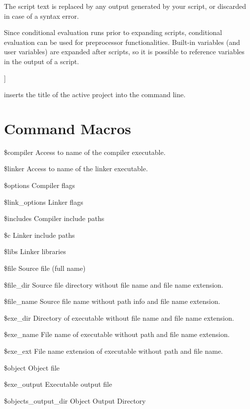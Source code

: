 
The script text is replaced by any output generated by your script, or discarded in case of a syntax error.

Since conditional evaluation runs prior to expanding scripts, conditional evaluation can be used for preprocessor functionalities. Built-in variables (and user variables) are expanded after scripts, so it is possible to reference variables in the output of a script.

\begin{code}
[[ print(GetProjectManager().GetActiveProject().GetTitle()); ]]
\end{code}

inserts the title of the active project into the command line.

\section{Command Macros}\label{sec:command_macros}

\begin{codeentry}
\item[\$compiler] Access to name of the compiler executable.
\item[\$linker] Access to name of the linker executable.
\item[\$options] Compiler flags
\item[\$link\_options] Linker flags
\item[\$includes] Compiler include paths
\item[\$c] Linker include paths
\item[\$libs] Linker libraries
\item[\$file] Source file (full name)
\item[\$file\_dir] Source file directory without file name and file name extension.
\item[\$file\_name] Source file name without path info and file name extension.
\item[\$exe\_dir] Directory of executable without file name and file name extension.
\item[\$exe\_name] File name of executable without path and file name extension.
\item[\$exe\_ext] File name extension of executable without path and file name.
\item[\$object] Object file
\item[\$exe\_output] Executable output file
\item[\$objects\_output\_dir] Object Output Directory
\end{codeentry}

